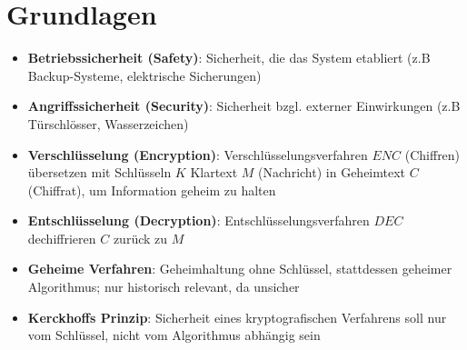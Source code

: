 \section{Grundlagen}%
\label{grund:sec:grundlagen}

\begin{itemize}
	\item \textbf{Betriebssicherheit (Safety)}: Sicherheit, die das System etabliert (z.B Backup-Systeme, elektrische Sicherungen)
	\item \textbf{Angriffssicherheit (Security)}: Sicherheit bzgl. externer Einwirkungen (z.B Türschlösser, Wasserzeichen)
	\item \textbf{Verschlüsselung (Encryption)}: Verschlüsselungsverfahren $ENC$ (Chiffren) übersetzen mit Schlüsseln $K$ Klartext $M$ (Nachricht) in Geheimtext $C$ (Chiffrat), um Information geheim zu halten
	\item \textbf{Entschlüsselung (Decryption)}: Entschlüsselungsverfahren $DEC$ dechiffrieren $C$ zurück zu $M$
	\item \textbf{Geheime Verfahren}: Geheimhaltung ohne Schlüssel, stattdessen geheimer Algorithmus; nur historisch relevant, da unsicher
	\item \textbf{Kerckhoffs Prinzip}: Sicherheit eines kryptografischen Verfahrens soll nur vom Schlüssel, nicht vom Algorithmus abhängig sein
\end{itemize}
